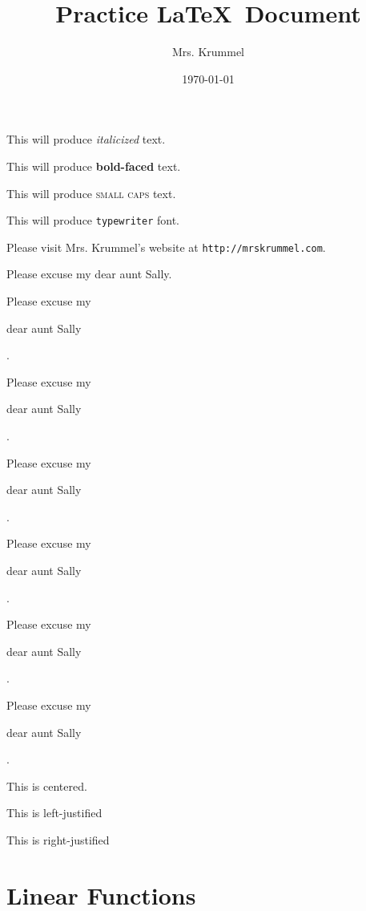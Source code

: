 \documentclass[11pt]{article}
\begin{document}
\tableofcontents

\title{Practice \LaTeX \ Document}
\author{Mrs. Krummel}
\date{\today}
\maketitle

This will produce \textit{italicized} text.

This will produce \textbf{bold-faced} text.

This will produce \textsc{small caps} text.

This will produce \texttt{typewriter} font.

Please visit Mrs. Krummel's website at \texttt{http://mrskrummel.com}.

Please excuse my dear aunt Sally.

Please excuse my \begin{large}dear aunt Sally\end{large}.

Please excuse my \begin{Large}dear aunt Sally\end{Large}.

Please excuse my \begin{huge}dear aunt Sally\end{huge}.

Please excuse my \begin{Huge}dear aunt Sally\end{Huge}.

Please excuse my \begin{small}dear aunt Sally\end{small}.

Please excuse my \begin{tiny}dear aunt Sally\end{tiny}.

\begin{center}
This is centered.
\end{center}

\begin{flushleft}
This is left-justified
\end{flushleft}

\begin{flushright}
This is right-justified
\end{flushright}

\section{Linear Functions}
\end{document}
